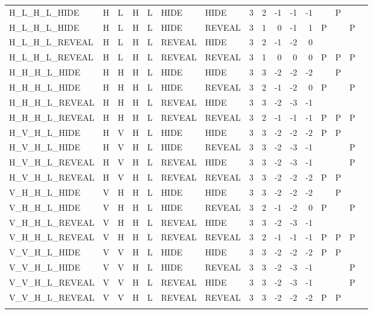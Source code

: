 \begin{longtable}{lllllllrrrrrllll}
  H\_L\_H\_L\_HIDE & H & L & H & L & HIDE & HIDE & 3 & 2 & -1 & -1 & -1 &  & P &  &  \\ 
  H\_L\_H\_L\_HIDE & H & L & H & L & HIDE & REVEAL & 3 & 1 & 0 & -1 & 1 & P &  & P &  \\ 
  H\_L\_H\_L\_REVEAL & H & L & H & L & REVEAL & HIDE & 3 & 2 & -1 & -2 & 0 &  &  &  &  \\ 
  H\_L\_H\_L\_REVEAL & H & L & H & L & REVEAL & REVEAL & 3 & 1 & 0 & 0 & 0 & P & P & P &  \\ 
  H\_H\_H\_L\_HIDE & H & H & H & L & HIDE & HIDE & 3 & 3 & -2 & -2 & -2 &  & P &  &  \\ 
  H\_H\_H\_L\_HIDE & H & H & H & L & HIDE & REVEAL & 3 & 2 & -1 & -2 & 0 & P &  & P &  \\ 
  H\_H\_H\_L\_REVEAL & H & H & H & L & REVEAL & HIDE & 3 & 3 & -2 & -3 & -1 &  &  &  &  \\ 
  H\_H\_H\_L\_REVEAL & H & H & H & L & REVEAL & REVEAL & 3 & 2 & -1 & -1 & -1 & P & P & P &  \\ 
  H\_V\_H\_L\_HIDE & H & V & H & L & HIDE & HIDE & 3 & 3 & -2 & -2 & -2 & P & P &  &  \\ 
  H\_V\_H\_L\_HIDE & H & V & H & L & HIDE & REVEAL & 3 & 3 & -2 & -3 & -1 &  &  & P &  \\ 
  H\_V\_H\_L\_REVEAL & H & V & H & L & REVEAL & HIDE & 3 & 3 & -2 & -3 & -1 &  &  & P &  \\ 
  H\_V\_H\_L\_REVEAL & H & V & H & L & REVEAL & REVEAL & 3 & 3 & -2 & -2 & -2 & P & P &  &  \\ 
  V\_H\_H\_L\_HIDE & V & H & H & L & HIDE & HIDE & 3 & 3 & -2 & -2 & -2 &  & P &  &  \\ 
  V\_H\_H\_L\_HIDE & V & H & H & L & HIDE & REVEAL & 3 & 2 & -1 & -2 & 0 & P &  & P &  \\ 
  V\_H\_H\_L\_REVEAL & V & H & H & L & REVEAL & HIDE & 3 & 3 & -2 & -3 & -1 &  &  &  &  \\ 
  V\_H\_H\_L\_REVEAL & V & H & H & L & REVEAL & REVEAL & 3 & 2 & -1 & -1 & -1 & P & P & P &  \\ 
  V\_V\_H\_L\_HIDE & V & V & H & L & HIDE & HIDE & 3 & 3 & -2 & -2 & -2 & P & P &  &  \\ 
  V\_V\_H\_L\_HIDE & V & V & H & L & HIDE & REVEAL & 3 & 3 & -2 & -3 & -1 &  &  & P &  \\ 
  V\_V\_H\_L\_REVEAL & V & V & H & L & REVEAL & HIDE & 3 & 3 & -2 & -3 & -1 &  &  & P &  \\ 
  V\_V\_H\_L\_REVEAL & V & V & H & L & REVEAL & REVEAL & 3 & 3 & -2 & -2 & -2 & P & P &  &  \\ 
   \hline
\hline
\label{truthtable}
\end{longtable}
\endgroup
